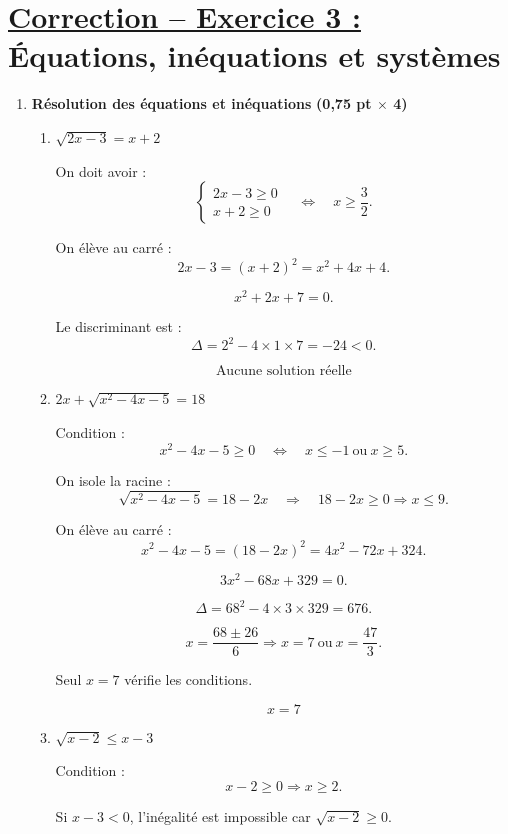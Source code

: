 \documentclass[12pt,a4paper]{article}
\begin{document}
\section*{\underline{Correction – Exercice 3 :} Équations, inéquations et systèmes}

\begin{enumerate}

\item \textbf{Résolution des équations et inéquations} \hfill \textbf{(0,75 pt $\times$ 4)}

\begin{enumerate}

\item $\sqrt{2x-3}=x+2$

On doit avoir :
\[
\begin{cases}
2x-3 \ge 0 \\
x+2 \ge 0
\end{cases}
\quad \Longleftrightarrow \quad
x \ge \dfrac{3}{2}.
\]

On élève au carré :
\[
2x-3=(x+2)^2=x^2+4x+4.
\]

\[
x^2+2x+7=0.
\]

Le discriminant est :
\[
\Delta=2^2-4\times1\times7=-24<0.
\]

\[
\boxed{\text{Aucune solution réelle}}
\]

\item $2x+\sqrt{x^2-4x-5}=18$

Condition :
\[
x^2-4x-5 \ge 0 \quad \Longleftrightarrow \quad x\le -1 \ \text{ou}\ x\ge5.
\]

On isole la racine :
\[
\sqrt{x^2-4x-5}=18-2x \quad \Rightarrow \quad 18-2x \ge 0 \Rightarrow x\le9.
\]

On élève au carré :
\[
x^2-4x-5=(18-2x)^2=4x^2-72x+324.
\]

\[
3x^2-68x+329=0.
\]

\[
\Delta=68^2-4\times3\times329=676.
\]

\[
x=\frac{68\pm26}{6} \Rightarrow x=7 \ \text{ou}\ x=\frac{47}{3}.
\]

Seul $x=7$ vérifie les conditions.

\[
\boxed{x=7}
\]

\item $\sqrt{x-2} \le x-3$

Condition :
\[
x-2 \ge 0 \Rightarrow x \ge 2.
\]

Si $x-3<0$, l’inégalité est impossible car $\sqrt{x-2}\ge0$.


\end{enumerate}
\end{enumerate}
\end{document}
